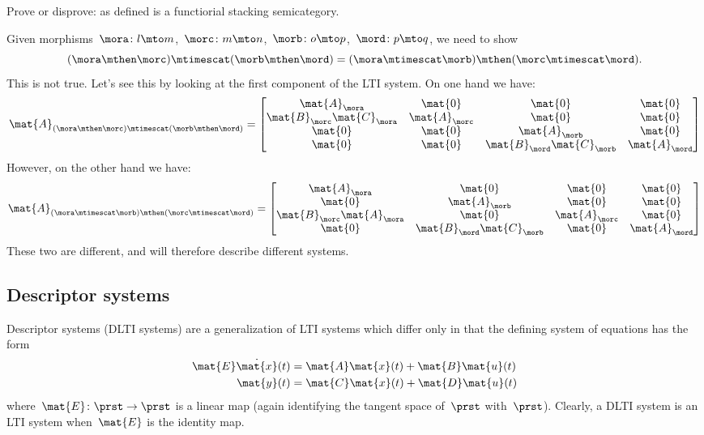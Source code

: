 \begin{exercise}
Prove or disprove: \LTI as defined is a functiorial stacking semicategory.    
\end{exercise}    
\begin{solution}
Given morphisms~$\mora\colon l\mto m$,~$\morc\colon m\mto n$,~$\morb\colon o\mto p$,~$\mord\colon p\mto q$, we need to show
\begin{equation*}
    (\mora \mthen \morc)\mtimescat (\morb\mthen \mord)=(\mora\mtimescat \morb)\mthen (\morc\mtimescat \mord).
\end{equation*}    
This is not true.
Let's see this by looking at the first component of the LTI system.
On one hand we have:
\begin{equation*}
    \mat{A}_{(\mora \mthen \morc)\mtimescat (\morb\mthen \mord)}=
    \begin{bmatrix}
        \mat{A}_\mora&\mat{0}&\mat{0}&\mat{0}\\
        \mat{B}_\morc\mat{C}_\mora&\mat{A}_\morc&\mat{0}&\mat{0}\\
        \mat{0}&\mat{0}&\mat{A}_\morb&\mat{0}\\
        \mat{0}&\mat{0}&\mat{B}_\mord\mat{C}_\morb&\mat{A}_\mord
    \end{bmatrix}    
\end{equation*}    
However, on the other hand we have:
\begin{equation*}
    \mat{A}_{(\mora\mtimescat \morb)\mthen (\morc\mtimescat \mord)}=
    \begin{bmatrix}
        \mat{A}_\mora&\mat{0}&\mat{0}&\mat{0}\\
        \mat{0}&\mat{A}_\morb&\mat{0}&\mat{0}\\
        \mat{B}_\morc \mat{A}_\mora&\mat{0}&\mat{A}_\morc&\mat{0}\\
        \mat{0}&\mat{B}_\mord \mat{C}_\morb&\mat{0}&\mat{A}_\mord
    \end{bmatrix}    
\end{equation*}  
These two are different, and will therefore describe different systems.  
\end{solution}    
\subsection{Descriptor systems}

Descriptor systems (DLTI systems) are a generalization of LTI systems which differ only in that the defining system of equations has the form
\begin{align}
    \mat{E} \dot{\mat{x}}(t) & = \mat{A}\mat{x}(t) + \mat{B}\mat{u}(t) \label{eq:DLTI-system-dyn} \\
    \mat{y}(t)        & = \mat{C}\mat{x}(t) + \mat{D}\mat{u}(t) \label{eq:DLTI-system-ro}
\end{align}
where~$\mat{E}\colon \prst \to \prst$ is a linear map (again identifying the tangent space of~$\prst$ with~$\prst$).
Clearly, a DLTI system is an LTI system when~$\mat{E}$ is the identity map.

